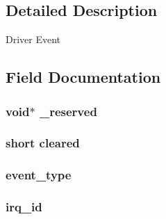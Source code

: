 \subsection{Detailed Description}
Driver Event 

\subsection{Field Documentation}
\subsubsection[{\texorpdfstring{\+\_\+reserved}{_reserved}}]{\setlength{\rightskip}{0pt plus 5cm}void$\ast$ \+\_\+reserved}\hypertarget{struct_drv_event_abb7722001f04208434c040733ffba3c9}{}\label{struct_drv_event_abb7722001f04208434c040733ffba3c9}
\subsubsection[{\texorpdfstring{cleared}{cleared}}]{\setlength{\rightskip}{0pt plus 5cm}short cleared}\hypertarget{struct_drv_event_ac831d1d2fd8bf5bb89ec82259d1930a2}{}\label{struct_drv_event_ac831d1d2fd8bf5bb89ec82259d1930a2}
\subsubsection[{\texorpdfstring{event\+\_\+type}{event_type}}]{ event\+\_\+type}\hypertarget{struct_drv_event_a7fb79c00664b2e1634d12eed5b49af7f}{}\label{struct_drv_event_a7fb79c00664b2e1634d12eed5b49af7f}
\subsubsection[{\texorpdfstring{irq\+\_\+id}{irq_id}}]{ irq\+\_\+id}\hypertarget{struct_drv_event_a0b4c8b371cfeb7c552ac3922ac9526ba}{}\label{struct_drv_event_a0b4c8b371cfeb7c552ac3922ac9526ba}
